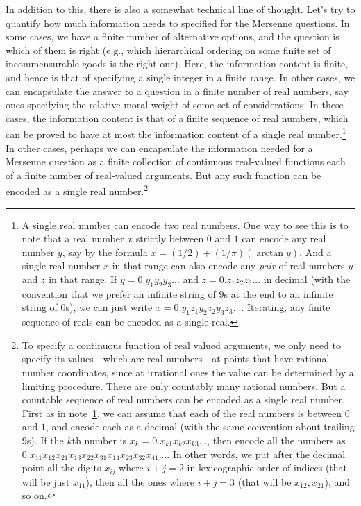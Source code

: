 In addition to this, there is also a somewhat technical line of thought. Let's try to quantify how much information
needs to specified for the Mersenne questions. In some cases, we have a finite number of alternative options, and 
the question is which of them is right (e.g., which hierarchical ordering on some finite set of incommensurable goods 
is the right one). Here, the information content is finite, and hence is that of specifying a single integer in a 
finite range. In other cases, we can encapsulate the answer to a question
in a finite number of real numbers, say ones specifying the relative moral weight of some set of considerations.
In these cases, the information content is that of a finite sequence of real numbers, which can be proved to have 
at most the information content of a single real number.\footnote{\label{fn:encode}A single real number can encode two real numbers.
One way to see this is to note that a real number $x$ strictly between $0$ and $1$ can encode any real number
$y$, say by the formula $x = (1/2)+(1/\pi)(\arctan y)$. And a single real number $x$ in that range can also encode 
any \textit{pair} of real numbers $y$ and $z$ in that range. If $y=0.y_1y_2y_3...$ and $z=0.z_1z_2z_3...$ in decimal
(with the convention that we prefer an infinite string of $9$s at the end to an infinite string of $0$s),
we can just write $x=0.y_1z_1y_2z_2y_3z_3...$. Iterating, any finite sequence of reals can be encoded as a single real.} In other cases, perhaps we can encapsulate the information needed
for a Mersenne question as a finite collection of continuous real-valued functions each of a finite number of 
real-valued arguments. But any such function can be encoded as a single real number.\footnote{To specify a 
continuous function of real valued arguments, we only need to specify its values---which are real numbers---at points that have rational number coordinates, since at irrational ones the value can be determined by a limiting procedure. There are
only countably many rational numbers. But a countable sequence of real numbers can be encoded as a single real
number. First as in note~\ref{fn:encode}, we can assume that each of the real numbers is between $0$ and $1$,
and encode each as a decimal (with the same convention about trailing $9$s). If the $k$th number is
$x_k=0.x_{k1}x_{k2}x_{k3}...$, then encode all the numbers as 
$0.x_{11}x_{12}x_{21}x_{13}x_{22}x_{31}x_{14}x_{23}x_{32}x_{41}...$. In other words, we put after the decimal point all the digits $x_{ij}$ where $i+j=2$ in lexicographic order of indices (that
will be just $x_{11}$),
then all the ones where $i+j=3$ (that will be $x_{12},x_{21}$), and so on.}
